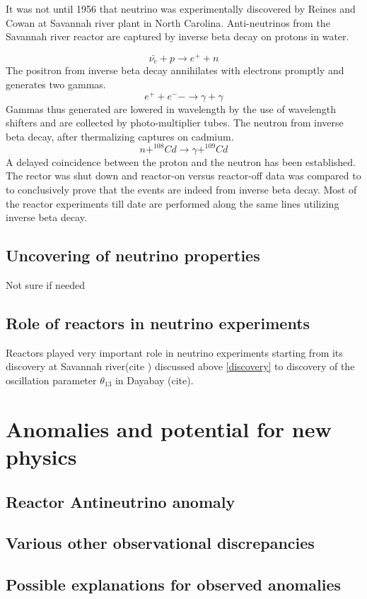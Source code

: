 \documentclass[11pt]{article}
\begin{document}
It was not until 1956 that neutrino was experimentally discovered by Reines and Cowan at Savannah river plant in North Carolina.  Anti-neutrinos from the Savannah river reactor are captured by inverse beta decay on protons in water. 

$$ \bar{\nu_{e}} + p \rightarrow e^{+} + n  $$
The positron from inverse beta decay annihilates with electrons promptly and generates two gammas.
$$ e^{+} + e^{-} -\rightarrow \gamma + \gamma $$
Gammas thus generated are lowered in wavelength by the use of wavelength shifters and are collected by photo-multiplier tubes. The neutron from inverse beta decay, after thermalizing captures on cadmium. 
$$ n + ^{108}Cd \rightarrow \gamma + ^ {109}Cd  $$ 
A delayed coincidence between the proton and the neutron has been established. The rector was shut down and reactor-on versus reactor-off data was compared to to conclusively prove that the events are indeed from inverse beta decay. Most of the reactor experiments till date are performed along the same lines utilizing inverse beta decay. 
\subsection{Uncovering of neutrino properties}
Not sure if needed
\subsection{Role of reactors in neutrino experiments}
Reactors played very important role in neutrino experiments starting from its discovery at Savannah river(cite ) discussed above \ref{discovery} to discovery of the oscillation parameter $ \theta_{13} $ in Dayabay (cite). 

\section{Anomalies and potential for new physics}

\subsection{Reactor Antineutrino anomaly }

\subsection{Various other observational discrepancies}

\subsection{Possible explanations for observed anomalies}
\end{document}
